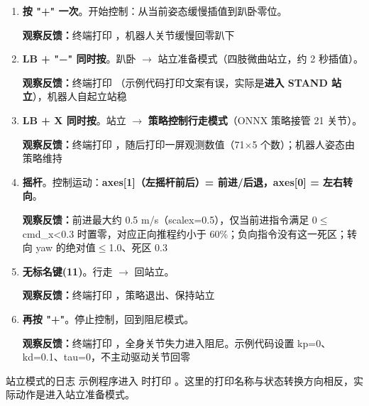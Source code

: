 \begin{enumerate}[label=\arabic*.]
\item \textbf{按 \textbf{"+"} 一次}。开始控制：从当前姿态缓慢插值到趴卧零位。\par
\textbf{观察反馈：}终端打印 ，机器人关节缓慢回零趴下
\item \textbf{\textbf{LB + "−"} 同时按}。趴卧 $\rightarrow$ 站立准备模式（四肢微曲站立，约 2 秒插值）。\par
\textbf{观察反馈：}终端打印 （示例代码打印文案有误，实际是\textbf{进入 STAND 站立}），机器人自起立站稳
\item \textbf{\textbf{LB + X} 同时按}。站立 $\rightarrow$ \textbf{策略控制行走模式}（ONNX 策略接管 21 关节）。\par
\textbf{观察反馈：}终端打印 ，随后打印一屏观测数值（71$\times$5 个数）；机器人姿态由策略维持
\item \textbf{摇杆}。控制运动：\textbf{axes[1]（左摇杆前后）= 前进/后退，axes[0] = 左右转向}。\par
\textbf{观察反馈：}前进最大约 0.5 m/s（scalex=0.5），仅当前进指令满足 0$\leq$cmd\_x<0.3 时置零，对应正向推程约小于 60\%；负向指令没有这一死区；转向 yaw 的绝对值$\leq$1.0、死区 0.3
\item \textbf{\textbf{无标名键(11)}}。行走 $\rightarrow$ 回站立。\par
\textbf{观察反馈：}终端打印 ，策略退出、保持站立
\item \textbf{再按 \textbf{"+"}}。停止控制，回到阻尼模式。\par
\textbf{观察反馈：}终端打印 ，全身关节失力进入阻尼。示例代码设置 kp=0、kd=0.1、tau=0，不主动驱动关节回零
\end{enumerate}
\begin{remark}{站立模式的日志}
示例程序进入  时打印 。这里的打印名称与状态转换方向相反，实际动作是进入站立准备模式。
\end{remark}

